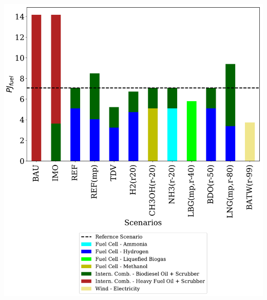 \documentclass[article]{elsarticle}
\begin{document}
\begin{minipage}[t]{0.49\textwidth}
    \centering
    \captionsetup{justification=centering}
    \includegraphics[width=.95\textwidth]{figures/AllFuel2050.pdf}
    \label{fig:AllFuel2050}
\end{minipage}\\[0.75cm]


\end{document}
